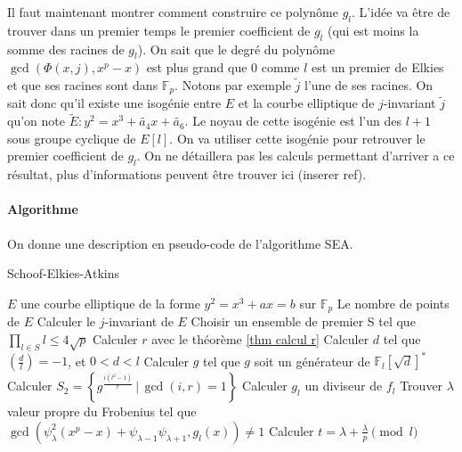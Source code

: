 \documentclass{article}
\begin{document}
Il faut maintenant montrer comment construire ce polynôme $g_l$. L'idée va être de trouver dans un premier temps le premier coefficient de $g_l$ (qui est moins la somme des racines de $g_l$). On sait que le degré du polynôme $\gcd(\Phi(x,j),x^p-x)$ est plus grand que $0$ comme $l$ est un premier de Elkies et que ses racines sont dans $\mathbb{F}_p$. Notons par exemple $\tilde{j}$ l'une de ses racines. On sait donc qu'il existe une isogénie entre $E$ et la courbe elliptique de $j$-invariant $\tilde{j}$ qu'on note $\tilde{E}:y^2=x^3+\tilde{a_4}x+\tilde{a_6}$. Le noyau de cette isogénie est l'un des $l+1$ sous groupe cyclique de $E[l]$. On va utiliser cette isogénie pour retrouver le premier coefficient de $g_l$. On ne détaillera pas les calculs permettant d'arriver a ce résultat, plus d'informations peuvent être trouver ici (inserer ref).




\newpage
\paragraph*{Algorithme}
On donne une description en pseudo-code de l'algorithme SEA.
\begin{algorithm}
\caption{Schoof-Elkies-Atkins}
\begin{algorithmic}
\REQUIRE $E$ une courbe elliptique de la forme $y^2 = x^3 + ax = b$ sur $\mathbb{F}_p$
\ENSURE Le nombre de points de $E$
\STATE Calculer le $j$-invariant de $E$
\STATE Choisir un ensemble de premier S tel que $\prod_{l \in S}l \leq 4\sqrt{p}$
\STATE Calculer $r$ avec le théorème \ref{thm calcul r}
\STATE Calculer $d$ tel que $(\frac{d}{l}) = -1$, et $0<d<l$
\STATE Calculer $g$ tel que $g$ soit un générateur de $\mathbb{F}_l[\sqrt{d}]^*$
\STATE Calculer $S_2 = \left\{g^{\frac{i(l^2-1)}{r}} \, | \, \gcd(i,r) = 1 \right\}$
\ENDFOR
\ELSE
\STATE Calculer $g_l$ un diviseur de $f_l$
\STATE Trouver $\lambda$ valeur propre du Frobenius tel que $\gcd(\psi_{\lambda}^2(x^p-x) + \psi_{\lambda-1}\psi_{\lambda+1}, g_l(x)) \ne 1$
\STATE Calculer $t = \lambda + \frac{\lambda}{p} \pmod l$

\ENDIF
\ENDFOR
\end{algorithmic}
\end{algorithm}
\end{document}
